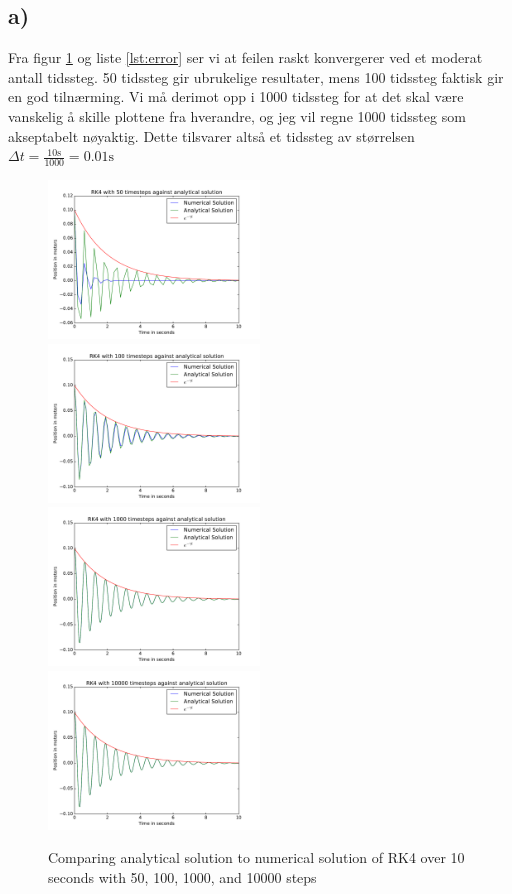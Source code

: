 \documentclass[12p,a4paper]{article}
\begin{document}
\subsection*{a)}
Fra figur \ref{fig:error} og liste \ref{lst:error} ser vi at feilen raskt konvergerer ved et moderat antall tidssteg. 50 tidssteg gir ubrukelige resultater, mens 100 tidssteg faktisk gir en god tilnærming. Vi må derimot opp i 1000 tidssteg for at det skal være vanskelig å skille plottene fra hverandre, og jeg vil regne 1000 tidssteg som akseptabelt nøyaktig. Dette tilsvarer altså et tidssteg av størrelsen $\Delta t = \frac{10\mathrm{s}}{1000} = 0.01\mathrm{s}$
\begin{figure}[H] 
\includegraphics[width=0.5\textwidth]{fig/Pendulum50.pdf}
\includegraphics[width=0.5\textwidth]{fig/Pendulum100.pdf}
\includegraphics[width=0.5\textwidth]{fig/Pendulum1000.pdf}
\includegraphics[width=0.5\textwidth]{fig/Pendulum10000.pdf}
\caption{Comparing analytical solution to numerical solution of RK4 over 10 seconds with 50, 100, 1000, and 10000 steps}
\label{fig:error}
\end{figure}
\end{document}
